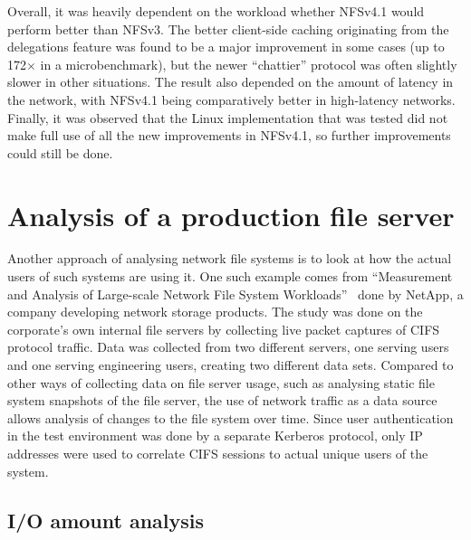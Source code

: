 Overall, it was heavily dependent on the workload whether NFSv4.1 would perform better than NFSv3.
The better client-side caching originating from the delegations feature was found to
be a major improvement in some cases (up to 172$\times$ in a microbenchmark),
but the newer ``chattier'' protocol was often slightly slower in other situations.
The result also depended on the amount of latency in the network,
with NFSv4.1 being comparatively better in high-latency networks.
Finally, it was observed that the Linux implementation that was tested
did not make full use of all the new improvements in NFSv4.1,
so further improvements could still be done.

\section{Analysis of a production file server} \label{sect:NetAppAnalysis}

Another approach of analysing network file systems is to look at how the actual users of such systems are using it.
One such example comes from ``Measurement and Analysis of Large-scale Network File System Workloads''~\cite{NetApp} done by NetApp,
a company developing network storage products.
The study was done on the corporate's own internal file servers by collecting live packet captures of CIFS protocol traffic.
Data was collected from two different servers, one serving users and one serving engineering users, creating two different data sets.
Compared to other ways of collecting data on file server usage, such as analysing static file system snapshots of the file server,
the use of network traffic as a data source allows analysis of changes to the file system over time.
Since user authentication in the test environment was done by a separate Kerberos protocol,
only IP addresses were used to correlate CIFS sessions to actual unique users of the system.

\subsection{I/O amount analysis}

